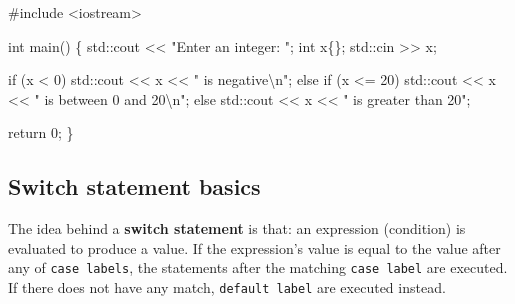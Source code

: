 \documentclass[
  letterpaper,
  DIV=11,
  numbers=noendperiod]{scrreprt}
\newenvironment{Shaded}{\begin{snugshade}}{\end{snugshade}}
\newcommand{\CommentTok}[1]{\textcolor[rgb]{0.37,0.37,0.37}{#1}}
\newcommand{\ControlFlowTok}[1]{\textcolor[rgb]{0.00,0.23,0.31}{#1}}
\newcommand{\DecValTok}[1]{\textcolor[rgb]{0.68,0.00,0.00}{#1}}
\newcommand{\ErrorTok}[1]{\textcolor[rgb]{0.68,0.00,0.00}{#1}}
\newcommand{\FunctionTok}[1]{\textcolor[rgb]{0.28,0.35,0.67}{#1}}
\newcommand{\NormalTok}[1]{\textcolor[rgb]{0.00,0.23,0.31}{#1}}
\newcommand{\SpecialCharTok}[1]{\textcolor[rgb]{0.37,0.37,0.37}{#1}}
\newcommand{\StringTok}[1]{\textcolor[rgb]{0.13,0.47,0.30}{#1}}
\begin{document}
\begin{Shaded}
\begin{Highlighting}[]
\CommentTok{\#include \textless{}iostream\textgreater{}}

\NormalTok{int }\FunctionTok{main}\NormalTok{()}
\NormalTok{\{}
\NormalTok{    std}\SpecialCharTok{::}\NormalTok{cout }\SpecialCharTok{\textless{}}\ErrorTok{\textless{}} \StringTok{"Enter an integer: "}\NormalTok{;}
\NormalTok{    int x\{\};}
\NormalTok{    std}\SpecialCharTok{::}\NormalTok{cin }\SpecialCharTok{\textgreater{}}\ErrorTok{\textgreater{}}\NormalTok{ x;}

    \ControlFlowTok{if}\NormalTok{ (x }\SpecialCharTok{\textless{}} \DecValTok{0}\NormalTok{)}
\NormalTok{        std}\SpecialCharTok{::}\NormalTok{cout }\SpecialCharTok{\textless{}}\ErrorTok{\textless{}}\NormalTok{ x }\SpecialCharTok{\textless{}}\ErrorTok{\textless{}} \StringTok{" is negative}\SpecialCharTok{\textbackslash{}n}\StringTok{"}\NormalTok{;}
    \ControlFlowTok{else} \ControlFlowTok{if}\NormalTok{ (x }\SpecialCharTok{\textless{}=} \DecValTok{20}\NormalTok{)}
\NormalTok{        std}\SpecialCharTok{::}\NormalTok{cout }\SpecialCharTok{\textless{}}\ErrorTok{\textless{}}\NormalTok{ x }\SpecialCharTok{\textless{}}\ErrorTok{\textless{}} \StringTok{" is between 0 and 20}\SpecialCharTok{\textbackslash{}n}\StringTok{"}\NormalTok{;}
    \ControlFlowTok{else}
\NormalTok{        std}\SpecialCharTok{::}\NormalTok{cout }\SpecialCharTok{\textless{}}\ErrorTok{\textless{}}\NormalTok{ x }\SpecialCharTok{\textless{}}\ErrorTok{\textless{}} \StringTok{" is greater than 20"}\NormalTok{;}

\NormalTok{    return }\DecValTok{0}\NormalTok{;}
\NormalTok{\}}
\end{Highlighting}
\end{Shaded}

\hypertarget{switch-statement-basics}{%
\subsection{Switch statement basics}\label{switch-statement-basics}}

The idea behind a \textbf{switch statement} is that: an expression
(condition) is evaluated to produce a value. If the expression's value
is equal to the value after any of \texttt{case\ labels}, the statements
after the matching \texttt{case\ label} are executed. If there does not
have any match, \texttt{default\ label} are executed instead.
\end{document}

